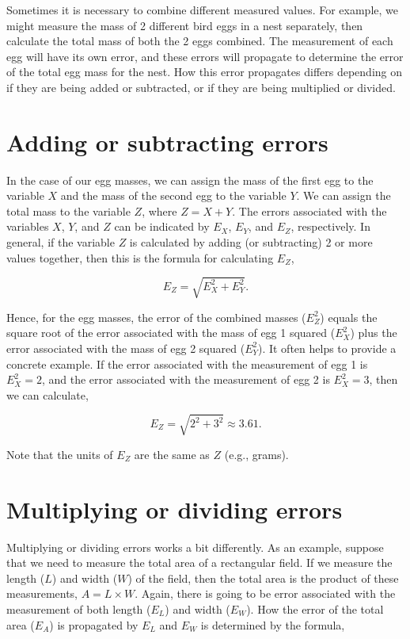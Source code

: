 \documentclass[
]{scrbook}
\begin{document}
Sometimes it is necessary to combine different measured values.
For example, we might measure the mass of 2 different bird eggs in a nest separately, then calculate the total mass of both the 2 eggs combined.
The measurement of each egg will have its own error, and these errors will propagate to determine the error of the total egg mass for the nest.
How this error propagates differs depending on if they are being added or subtracted, or if they are being multiplied or divided.

\hypertarget{adding-or-subtracting-errors}{%
\section{Adding or subtracting errors}\label{adding-or-subtracting-errors}}

In the case of our egg masses, we can assign the mass of the first egg to the variable \(X\) and the mass of the second egg to the variable \(Y\).
We can assign the total mass to the variable \(Z\), where \(Z = X + Y\).
The errors associated with the variables \(X\), \(Y\), and \(Z\) can be indicated by \(E_{X}\), \(E_{Y}\), and \(E_{Z}\), respectively.
In general, if the variable \(Z\) is calculated by adding (or subtracting) 2 or more values together, then this is the formula for calculating \(E_{Z}\),

\[E_{Z} = \sqrt{E^{2}_{X} + E^{2}_{Y}}.\]

Hence, for the egg masses, the error of the combined masses (\(E^{2}_{Z}\)) equals the square root of the error associated with the mass of egg 1 squared (\(E^{2}_{X}\)) plus the error associated with the mass of egg 2 squared (\(E^{2}_{Y}\)).
It often helps to provide a concrete example.
If the error associated with the measurement of egg 1 is \(E^{2}_{X} = 2\), and the error associated with the measurement of egg 2 is \(E^{2}_{X} = 3\), then we can calculate,

\[E_{Z} = \sqrt{2^{2} + 3^{2}} \approx 3.61.\]

Note that the units of \(E_{Z}\) are the same as \(Z\) (e.g., grams).

\hypertarget{multiplying-or-dividing-errors}{%
\section{Multiplying or dividing errors}\label{multiplying-or-dividing-errors}}

Multiplying or dividing errors works a bit differently.
As an example, suppose that we need to measure the total area of a rectangular field.
If we measure the length (\(L\)) and width (\(W\)) of the field, then the total area is the product of these measurements, \(A = L \times W\).
Again, there is going to be error associated with the measurement of both length (\(E_{L}\)) and width (\(E_{W}\)).
How the error of the total area (\(E_{A}\)) is propagated by \(E_{L}\) and \(E_{W}\) is determined by the formula,
\end{document}
